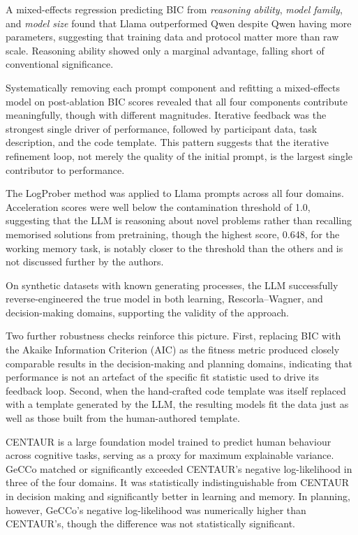 A mixed-effects regression predicting BIC from \emph{reasoning ability}, \emph{model family}, and \emph{model size} found that Llama outperformed Qwen despite Qwen having more parameters, suggesting that training data and protocol matter more than raw scale. Reasoning ability showed only a marginal advantage, falling short of conventional significance.

Systematically removing each prompt component and refitting a mixed-effects model on post-ablation BIC scores revealed that all four components contribute meaningfully, though with different magnitudes. Iterative feedback was the strongest single driver of performance, followed by participant data, task description, and the code template. This pattern suggests that the iterative refinement loop, not merely the quality of the initial prompt, is the largest single contributor to performance.

The LogProber method was applied to Llama prompts across all four domains. Acceleration scores were well below the contamination threshold of 1.0, suggesting that the LLM is reasoning about novel problems rather than recalling memorised solutions from pretraining, though the highest score, 0.648, for the working memory task, is notably closer to the threshold than the others and is not discussed further by the authors.

On synthetic datasets with known generating processes, the LLM successfully reverse-engineered the true model in both learning, Rescorla--Wagner, and decision-making domains, supporting the validity of the approach.

Two further robustness checks reinforce this picture. First, replacing BIC with the Akaike Information Criterion (AIC) as the fitness metric produced closely comparable results in the decision-making and planning domains, indicating that performance is not an artefact of the specific fit statistic used to drive its feedback loop. Second, when the hand-crafted code template was itself replaced with a template generated by the LLM, the resulting models fit the data just as well as those built from the human-authored template. 

CENTAUR is a large foundation model trained to predict human behaviour across cognitive tasks, serving as a proxy for maximum explainable variance. GeCCo matched or significantly exceeded CENTAUR's negative log-likelihood in three of the four domains. It was statistically indistinguishable from CENTAUR in decision making and significantly better in learning and memory. In planning, however, GeCCo's negative log-likelihood was numerically higher than CENTAUR's, though the difference was not statistically significant. 
